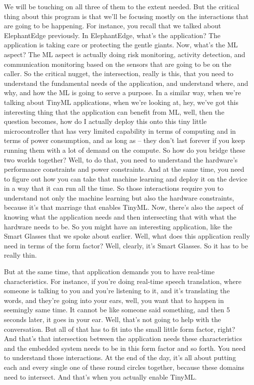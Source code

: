 We will be touching on all three of them to the extent needed.
But the critical thing about this program is that we'll be focusing mostly on the interactions that are going to be happening.
For instance, you recall that we talked about ElephantEdge previously.
In ElephantEdge, what's the application?
The application is taking care or protecting the gentle giants.
Now, what's the ML aspect?
The ML aspect is actually doing risk monitoring, activity detection, and communication monitoring based on the sensors that are going to be on the caller.
So the critical nugget, the intersection, really is this, that you need to understand the fundamental needs of the application, and understand where, and why, and how the ML is going to serve a purpose.
In a similar way, when we're talking about TinyML applications, when we're looking at, hey, we've got this interesting thing that the application can benefit from ML, well, then the question becomes, how do I actually deploy this onto this tiny little microcontroller that has very limited capability in terms of computing and in terms of power consumption, and as long as -- they don't last forever if you keep running them with a lot of demand on the compute.
So how do you bridge these two worlds together?
Well, to do that, you need to understand the hardware's performance constraints and power constraints.
And at the same time, you need to figure out how you can take that machine learning and deploy it on the device in a way that it can run all the time.
So those interactions require you to understand not only the machine learning but also the hardware constraints, because it's that marriage that enables TinyML.
Now, there's also the aspect of knowing what the application needs and then intersecting that with what the hardware needs to be.
So you might have an interesting application, like the Smart Glasses that we spoke about earlier.
Well, what does this application really need in terms of the form factor?
Well, clearly, it's Smart Glasses.
So it has to be really thin.

But at the same time, that application demands you to have real-time characteristics.
For instance, if you're doing real-time speech translation, where someone is talking to you and you're listening to it, and it's translating the words, and they're going into your ears, well, you want that to happen in seemingly same time.
It cannot be like someone said something, and then 5 seconds later, it goes in your ear.
Well, that's not going to help with the conversation.
But all of that has to fit into the small little form factor, right?
And that's that intersection between the application needs these characteristics and the embedded system needs to be in this form factor and so forth.
You need to understand those interactions.
At the end of the day, it's all about putting each and every single one of these round circles together, because these domains need to intersect.
And that's when you actually enable TinyML.

